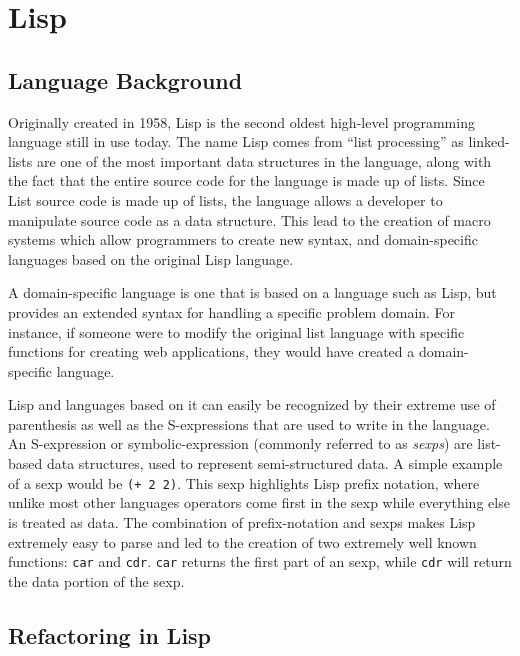 \documentclass{article}
\begin{document}

\section{Lisp}

\subsection{Language Background}

Originally created in 1958, Lisp is the second oldest high-level programming language still in use today. The name Lisp comes from ``list processing'' as linked-lists are one of the most important data structures in the language, along with the fact that the entire source code for the language is made up of lists. Since List source code is made up of lists, the language allows a developer to manipulate source code as a data structure. This lead to the creation of macro systems which allow programmers to create new syntax, and domain-specific languages based on the original Lisp language\cite{1}.

A domain-specific language is one that is based on a language such as Lisp, but provides an extended syntax for handling a specific problem domain. For instance, if someone were to modify the original list language with specific functions for creating web applications, they would have created a domain-specific language\cite{4}.

Lisp and languages based on it can easily be recognized by their extreme use of parenthesis as well as the S-expressions that are used to write in the language. An S-expression or symbolic-expression (commonly referred to as \textit{sexps}) are list-based data structures, used to represent semi-structured data. A simple example of a sexp would be \verb!(+ 2 2)!. This sexp highlights Lisp prefix notation, where unlike most other languages operators come first in the sexp while everything else is treated as data. The combination of prefix-notation and sexps makes Lisp extremely easy to parse and led to the creation of two extremely well known functions: \verb!car! and \verb!cdr!. \verb!car! returns the first part of an sexp, while \verb!cdr! will return the data portion of the sexp.


\subsection{Refactoring in Lisp}
\end{document}

